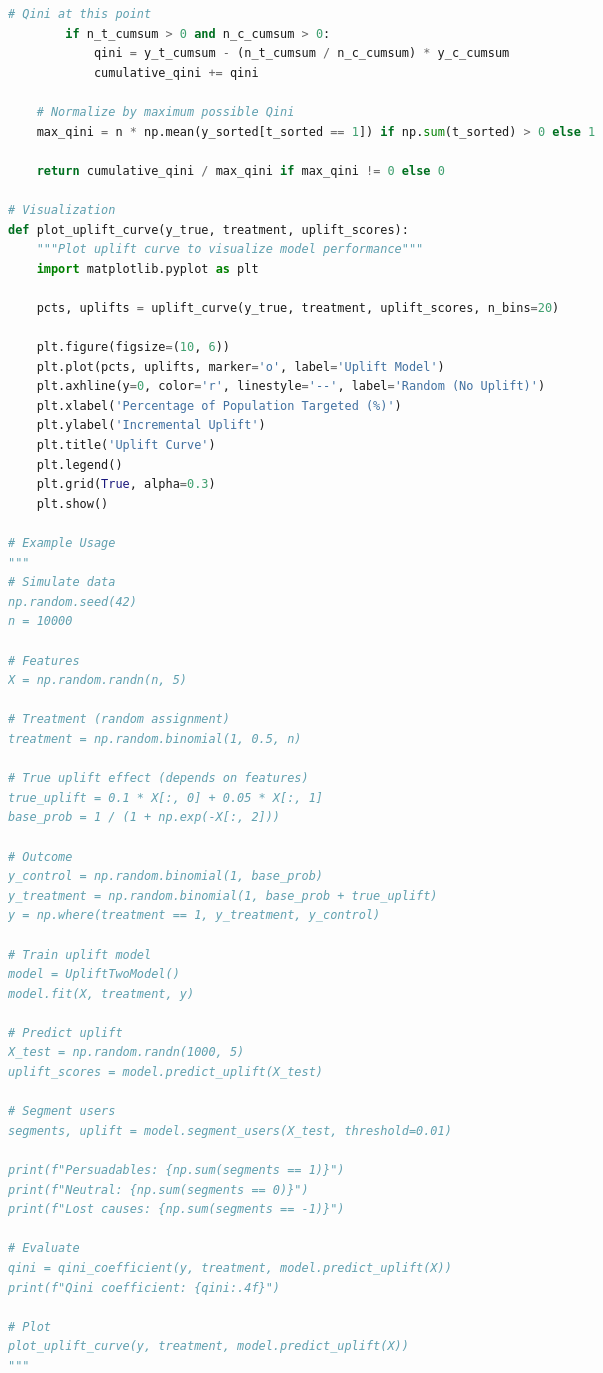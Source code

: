 \documentclass[8pt,landscape]{article}
\begin{document}
\begin{multicols}{3}
\begin{lstlisting}[language=Python]
        # Qini at this point
        if n_t_cumsum > 0 and n_c_cumsum > 0:
            qini = y_t_cumsum - (n_t_cumsum / n_c_cumsum) * y_c_cumsum
            cumulative_qini += qini

    # Normalize by maximum possible Qini
    max_qini = n * np.mean(y_sorted[t_sorted == 1]) if np.sum(t_sorted) > 0 else 1

    return cumulative_qini / max_qini if max_qini != 0 else 0

# Visualization
def plot_uplift_curve(y_true, treatment, uplift_scores):
    """Plot uplift curve to visualize model performance"""
    import matplotlib.pyplot as plt

    pcts, uplifts = uplift_curve(y_true, treatment, uplift_scores, n_bins=20)

    plt.figure(figsize=(10, 6))
    plt.plot(pcts, uplifts, marker='o', label='Uplift Model')
    plt.axhline(y=0, color='r', linestyle='--', label='Random (No Uplift)')
    plt.xlabel('Percentage of Population Targeted (%)')
    plt.ylabel('Incremental Uplift')
    plt.title('Uplift Curve')
    plt.legend()
    plt.grid(True, alpha=0.3)
    plt.show()

# Example Usage
"""
# Simulate data
np.random.seed(42)
n = 10000

# Features
X = np.random.randn(n, 5)

# Treatment (random assignment)
treatment = np.random.binomial(1, 0.5, n)

# True uplift effect (depends on features)
true_uplift = 0.1 * X[:, 0] + 0.05 * X[:, 1]
base_prob = 1 / (1 + np.exp(-X[:, 2]))

# Outcome
y_control = np.random.binomial(1, base_prob)
y_treatment = np.random.binomial(1, base_prob + true_uplift)
y = np.where(treatment == 1, y_treatment, y_control)

# Train uplift model
model = UpliftTwoModel()
model.fit(X, treatment, y)

# Predict uplift
X_test = np.random.randn(1000, 5)
uplift_scores = model.predict_uplift(X_test)

# Segment users
segments, uplift = model.segment_users(X_test, threshold=0.01)

print(f"Persuadables: {np.sum(segments == 1)}")
print(f"Neutral: {np.sum(segments == 0)}")
print(f"Lost causes: {np.sum(segments == -1)}")

# Evaluate
qini = qini_coefficient(y, treatment, model.predict_uplift(X))
print(f"Qini coefficient: {qini:.4f}")

# Plot
plot_uplift_curve(y, treatment, model.predict_uplift(X))
"""


\end{lstlisting}
\end{multicols}
\end{document}
